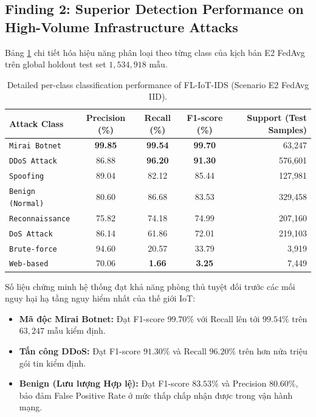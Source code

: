 \subsection{Finding 2: Superior Detection Performance on High-Volume Infrastructure Attacks}
Bảng \ref{tab:per_class_e2} chi tiết hóa hiệu năng phân loại theo từng class của kịch bản E2 FedAvg trên global holdout test set $1,534,918$ mẫu.

\begin{table}[H]
\centering
\caption{Detailed per-class classification performance of FL-IoT-IDS (Scenario E2 FedAvg IID).}
\label{tab:per_class_e2}
\small
\begin{tabular}{l c c c r}
\toprule
\textbf{Attack Class} & \textbf{Precision (\%)} & \textbf{Recall (\%)} & \textbf{F1-score (\%)} & \textbf{Support (Test Samples)} \\
\midrule
\texttt{Mirai Botnet} & \textbf{99.85} & \textbf{99.54} & \textbf{99.70} & 63,247 \\
\texttt{DDoS Attack} & 86.88 & \textbf{96.20} & \textbf{91.30} & 576,601 \\
\texttt{Spoofing} & 89.04 & 82.12 & 85.44 & 127,981 \\
\texttt{Benign (Normal)} & 80.60 & 86.68 & 83.53 & 329,458 \\
\texttt{Reconnaissance} & 75.82 & 74.18 & 74.99 & 207,160 \\
\texttt{DoS Attack} & 86.14 & 61.86 & 72.01 & 219,103 \\
\texttt{Brute-force} & 94.60 & 20.57 & 33.79 & 3,919 \\
\texttt{Web-based} & 70.06 & \textbf{1.66} & \textbf{3.25} & 7,449 \\
\bottomrule
\end{tabular}
\end{table}

Số liệu chứng minh hệ thống đạt khả năng phòng thủ tuyệt đối trước các mối nguy hại hạ tầng nguy hiểm nhất của thế giới IoT:
\begin{itemize}
    \item \textbf{Mã độc Mirai Botnet:} Đạt F1-score $\mathbf{99.70\%}$ với Recall lên tới $\mathbf{99.54\%}$ trên $63,247$ mẫu kiểm định.
    \item \textbf{Tấn công DDoS:} Đạt F1-score $\mathbf{91.30\%}$ và Recall $\mathbf{96.20\%}$ trên hơn nửa triệu gói tin kiểm định.
    \item \textbf{Benign (Lưu lượng Hợp lệ):} Đạt F1-score $83.53\%$ và Precision $80.60\%$, bảo đảm False Positive Rate ở mức thấp chấp nhận được trong vận hành mạng.
\end{itemize}

